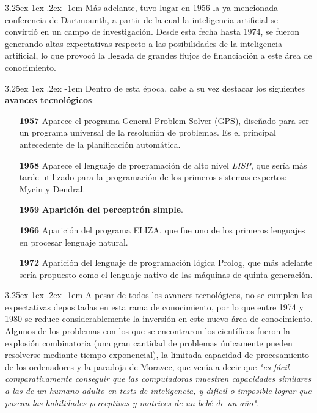 \documentclass{article}
\makeatletter
\renewcommand\paragraph{\@startsection{paragraph}{5}{\z@}%
      {3.25ex \@plus1ex \@minus.2ex}%
      {-1em}%
      {\normalfont\normalsize\bfseries}}
\makeatother
\begin{document}
    \paragraph{}
    Más adelante, tuvo lugar en 1956 la ya mencionada conferencia de Dartmounth, a partir de la cual la inteligencia artificial se convirtió en un campo de investigación. Desde esta fecha hasta 1974, se fueron generando altas expectativas respecto a las posibilidades de la inteligencia artificial, lo que provocó la llegada de grandes flujos de financiación a este área de conocimiento.
    
    \paragraph{}
    Dentro de esta época, cabe a su vez destacar los siguientes \textbf{avances tecnológicos}:
    \begin{itemize}
        \item[\textbf{1957}] Aparece el programa General Problem Solver (GPS)\cite{gps}, diseñado para ser un programa universal de la resolución de problemas. Es el principal antecedente de la planificación automática.
        \item[\textbf{1958}] Aparece el lenguaje de programación de alto nivel \textit{LISP}\cite{lisp}, que sería más tarde utilizado para la programación de los primeros sistemas expertos: Mycin\cite{Mycin} y Dendral\cite{dendral}.
        \item[\textbf{1959}] \textbf{Aparición del perceptrón simple}\cite{perceptron}.
        \item[\textbf{1966}] Aparición del programa ELIZA\cite{eliza}, que fue uno de los primeros lenguajes en procesar lenguaje natural.
        \item[\textbf{1972}] Aparición del lenguaje de programación lógica Prolog\cite{prolog}, que más adelante sería propuesto como el lenguaje nativo de las máquinas de quinta generación\cite{prolog5a}. 
    \end{itemize}
    
    \paragraph{}
    A pesar de todos los avances tecnológicos, no se cumplen las expectativas depositadas en esta rama de conocimiento, por lo que entre 1974 y 1980 se reduce considerablemente la inversión en este nuevo área de conocimiento. Algunos de los problemas con los que se encontraron los científicos fueron la explosión combinatoria (una gran cantidad de problemas únicamente pueden resolverse mediante tiempo exponencial), la limitada capacidad de procesamiento de los ordenadores y la paradoja de Moravec, que venía a decir que \textit{"es fácil comparativamente conseguir que las computadoras muestren capacidades similares a las de un humano adulto en tests de inteligencia, y difícil o imposible lograr que posean las habilidades perceptivas y motrices de un bebé de un año"}\cite{moravec}.
    
\end{document}
